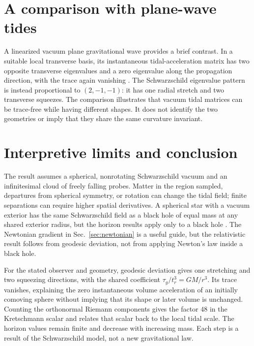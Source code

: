 \documentclass[12pt]{article}
\begin{document}
\section{A comparison with plane-wave tides}
\label{sec:plane-wave}

A linearized vacuum plane gravitational wave provides a brief contrast. In a suitable local transverse basis, its instantaneous tidal-acceleration matrix has two opposite transverse eigenvalues and a zero eigenvalue along the propagation direction, with the trace again vanishing \cite{TongGR}. The Schwarzschild eigenvalue pattern is instead proportional to $(2,-1,-1)$: it has one radial stretch and two transverse squeezes. The comparison illustrates that vacuum tidal matrices can be trace-free while having different shapes. It does not identify the two geometries or imply that they share the same curvature invariant.

\section{Interpretive limits and conclusion}
\label{sec:conclusion}

The result assumes a spherical, nonrotating Schwarzschild vacuum and an infinitesimal cloud of freely falling probes. Matter in the region sampled, departures from spherical symmetry, or rotation can change the tidal field; finite separations can require higher spatial derivatives. A spherical star with a vacuum exterior has the same Schwarzschild field as a black hole of equal mass at any shared exterior radius, but the horizon results apply only to a black hole \cite{TongGR}. The Newtonian gradient in Sec.~\ref{sec:newtonian} is a useful guide, but the relativistic result follows from geodesic deviation, not from applying Newton's law inside a black hole.

For the stated observer and geometry, geodesic deviation gives one stretching and two squeezing directions, with the shared coefficient $\tau_g/t_r^3=GM/r^3$. Its trace vanishes, explaining the zero instantaneous volume acceleration of an initially comoving sphere without implying that its shape or later volume is unchanged. Counting the orthonormal Riemann components gives the factor $48$ in the Kretschmann scalar and relates that scalar back to the local tidal scale. The horizon values remain finite and decrease with increasing mass. Each step is a result of the Schwarzschild model, not a new gravitational law.

\appendix
\end{document}
